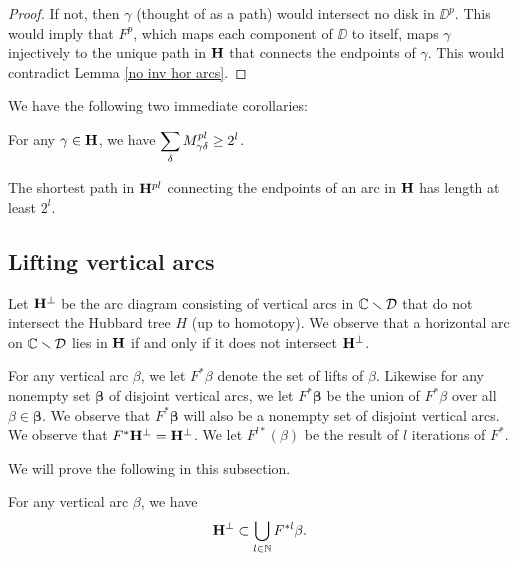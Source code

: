 \begin{proof}
If not,
then $\gamma$ (thought of as a path) would intersect no disk in $\DD^p$. 
This would imply that $F^p$, 
which maps each component of $\DD$ to itself,
maps $\gamma$ injectively to the unique path in ${\mathbf{H}}$ that connects the endpoints of $\gamma$.
This would contradict Lemma \ref{no inv hor arcs}.
\end{proof}

We have the following two immediate corollaries:
\begin{cor}
   For any $\gamma\in {\mathbf{H}}$, we have $\displaystyle{\sum_{\delta}M^{pl}_{\gamma{\delta}}\geq 2^l}$.

\end{cor}

\begin{cor} \label{cor:shortest-lp}
The shortest path in ${\mathbf{H}}^{pl}$ connecting the endpoints of an arc in ${\mathbf{H}}$ has length at least $2^l$. 
\end{cor}


\subsection{Lifting vertical arcs}

Let ${\mathbf{H}}^\perp$ be the arc diagram consisting  of vertical  arcs in ${\Bbb C}\smallsetminus {\mathcal D}$
that do not intersect the Hubbard tree $H$ (up to homotopy).
We observe that a horizontal arc on ${\Bbb C} \smallsetminus {\mathcal D}$ lies in ${\mathbf{H}}$ if and only if it does not intersect ${\mathbf{H}}^\perp$. 

For any vertical arc $\beta$, 
we let $F^*\beta$ denote the set of lifts of $\beta$. 
Likewise for any nonempty set $\boldsymbol{\beta}$ of disjoint vertical arcs,
we let $F^*\boldsymbol{\beta}$ be the union of $F^*\beta$ over all $\beta \in \boldsymbol{\beta}$. 
We observe that $F^*\boldsymbol{\beta}$ will also be a nonempty set of disjoint vertical arcs. 
We observe that $F^*{\mathbf{H}}^\perp = {\mathbf{H}}^\perp$. 
We let $F^{l*}(\beta)$ be the result of $l$ iterations of $F^*$.

We will prove the following in this subsection. 
\begin{lemma} \label{lem:pull-to-get-Hperp}
For any vertical arc $\beta$, we have 
$$
{\mathbf{H}}^\perp \subset \bigcup_{l \in {\Bbb N}} F^{*l}\beta. 
$$
\end{lemma}

